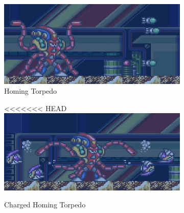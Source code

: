 \begin{figure}[htp]
	\centering
	\begin{subfigure}{0.48\textwidth}
		\centering
		\includegraphics[width=\linewidth]{figures/X1/Launch_octopus/Octopus_missile.jpg}
		\caption{Homing Torpedo}
	\end{subfigure}
	\begin{subfigure}{0.49\textwidth}
		\centering
<<<<<<< HEAD
		\includegraphics[width=\linewidth]{figures/X1/Launch_octopus/Octopus_piranha.jpg}
		\caption{Charged Homing Torpedo}
	\end{subfigure}
	\begin{subfigure}{0.2\textwidth}
		\centering

\end{subfigure}
\end{figure}

